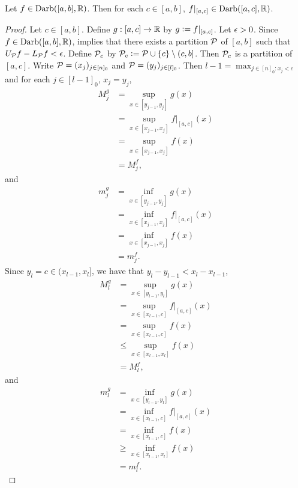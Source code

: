 \documentclass{book}
\begin{document}
	\begin{ex}
		Let $f \in \text{Darb}([a,b], \mathbb{R})$. Then for each $c \in [a,b]$, $f|_{[a,c]} \in \text{Darb}([a,c], \mathbb{R})$.
	\end{ex}
	
	\begin{proof}
		Let $c \in [a,b]$. Define $g:[a,c] \rightarrow \mathbb{R}$ by $g \vcentcolon= f|_{[a,c]}$. Let $\epsilon > 0$. Since $f \in \text{Darb}([a,b], \mathbb{R})$,  implies that there exists a partition $\mathcal{P}$ of $[a,b]$ such that $U_{\mathcal{P}}f - L_{\mathcal{P}}f < \epsilon$. Define $\mathcal{P}_c$ by $\mathcal{P}_c \vcentcolon= \mathcal{P} \cup \{c\} \setminus (c,b]$. Then $\mathcal{P}_c$ is a partition of $[a,c]$. Write $\mathcal{P} = (x_j)_{j \in [n]_0}$ and $\mathcal{P} = (y_j)_{j \in [l]_0}$. Then $l-1 = \max_{j \in [n]_0: x_j < c}$ and for each $j \in [l-1]_0$, $x_j = y_j$, 
		\begin{align*}
			M^g_j
			& = \sup_{x \in [y_{j-1}, y_j]} g(x) \\
			& = \sup_{x \in [x_{j-1}, x_j]} f|_{[a,c]}(x) \\
			& = \sup_{x \in [x_{j-1}, x_j]} f(x) \\
			& = M^f_j,
		\end{align*}
		and 
		\begin{align*}
			m^g_j
			& = \inf_{x \in [y_{j-1}, y_j]} g(x) \\
			& = \inf_{x \in [x_{j-1}, x_j]} f|_{[a,c]}(x) \\
			& = \inf_{x \in [x_{j-1}, x_j]} f(x) \\
			& = m^f_j.
		\end{align*}
		Since $y_l = c \in (x_{l-1}, x_l]$, we have that $y_l - y_{l-1} < x_l - x_{l-1}$,
		\begin{align*}
			M^g_l
			& = \sup_{x \in [y_{l-1}, y_l]} g(x) \\
			& = \sup_{x \in [x_{l-1}, c]} f|_{[a,c]}(x) \\
			& = \sup_{x \in [x_{l-1}, c]} f(x) \\
			& \leq \sup_{x \in [x_{l-1}, x_l]} f(x) \\
			& = M^f_l,
		\end{align*}
		and
		\begin{align*}
			m^g_l
			& = \inf_{x \in [y_{l-1}, y_l]} g(x) \\
			& = \inf_{x \in [x_{l-1}, c]} f|_{[a,c]}(x) \\
			& = \inf_{x \in [x_{l-1}, c]} f(x) \\
			& \geq \inf_{x \in [x_{l-1}, x_l]} f(x) \\
			& = m^f_l.

\end{align*}
\end{proof}
\end{document}

